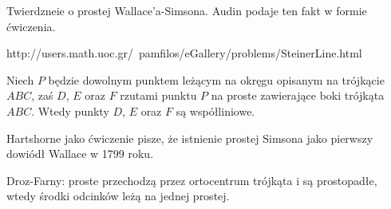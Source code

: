 Twierdzneie o prostej Wallace'a-Simsona. %
Audin \cite[s. 104]{audin_2003} podaje ten fakt w formie ćwiczenia.

http://users.math.uoc.gr/~pamfilos/eGallery/problems/SteinerLine.html

\begin{proposition}
	Niech $P$ będzie dowolnym punktem leżącym na okręgu opisanym na trójkącie $ABC$, zaś $D$, $E$ oraz $F$ rzutami punktu $P$ na proste zawierające boki trójkąta $ABC$.
	Wtedy punkty $D$, $E$ oraz $F$ są współliniowe.
\end{proposition}

Hartshorne jako ćwiczenie \cite[s. 61]{hartshorne2000} pisze, że istnienie prostej Simsona jako pierwszy dowiódł Wallace w 1799 roku.

Droz-Farny: proste przechodzą przez ortocentrum trójkąta i są prostopadłe, wtedy środki odcinków leżą na jednej prostej. %

%





